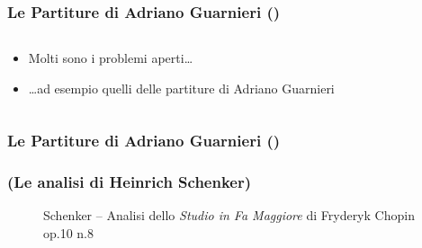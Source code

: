 \setcounter{ms}{0}
\begin{frame}
    \frametitle<+- | alert@+->{Le Partiture di Adriano Guarnieri ()}

    \begin{columns}[T]
        \begin{column}{0.7\textwidth}
				    \begin{itemize}[<+- | alert@+->]
				       \item Molti sono i problemi aperti\dots
				       \item \dots ad esempio quelli delle partiture di Adriano
				                    Guarnieri
				    \end{itemize}
        \end{column}
        \begin{column}{0.3\textwidth}
        \end{column}
    \end{columns}
    
\end{frame}

\begin{frame}
    \frametitle{Le Partiture di Adriano Guarnieri ()}

		\vspace{-0.4cm}
		\begin{figure}[H!]
       \href{run:\imagedir/Guarnieri-Passione-Lettera_M.jpg}
             {}
			 \caption{}
		\end{figure}

\end{frame}

\begin{frame}
    \frametitle{(Le analisi di Heinrich Schenker)}

    \begin{center}
        \begin{figure}
            \caption{Schenker -- Analisi dello \emph{Studio in Fa Maggiore} di Fryderyk Chopin op.10 n.8}
        \end{figure}
    \end{center}

\end{frame}
